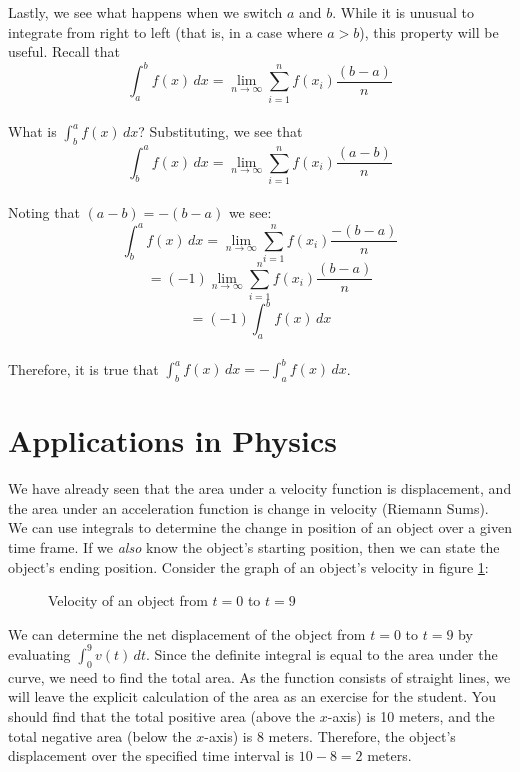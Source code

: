 Lastly, we see what happens when we switch $a$ and $b$. While it is 
unusual to integrate from right to left (that is, in a case where 
$a > b$), this property will be useful. Recall that $$\int_a^b f(x)\,dx 
= \lim_{n \to \infty} \sum_{i = 1}^{n} f(x_i)\frac{(b - a)}{n}$$\\ 
What is $\int_b^a f(x)\,dx$? Substituting, we see that $$\int_b^a f(x)
\,dx =\lim_{n \to \infty} \sum_{i=1}^{n} f(x_i) \frac{(a - b)}{n}$$\\ 
Noting that $(a - b) = -(b - a)$ we see: $$\int_b^a f(x)\,dx = \lim_{n \to 
\infty} \sum_{i = 1}^{n} f(x_i) \frac{-(b - a)}{n}$$ $$=(-1)\lim_{n 
\to \infty} \sum_{i = 1}^{n} f(x_i) \frac{(b - a)}{n}$$ $$=(-1)
\int_a^b f(x)\,dx$$ \\
Therefore, it is true that $\int_b^a f(x)\,dx = -\int_a^b f(x)\,dx$. 

\section{Applications in Physics}
We have already seen that the area under a velocity function is 
displacement, and the area under an acceleration function is change in 
velocity (Riemann Sums). We can use integrals to determine the change 
in position of an object over a given time frame. If we \textit{also} 
know the object's starting position, then we can state the object's 
ending position. Consider the graph of an object's velocity in figure 
\ref{fig:velocity-definite_integral}:

\begin{figure}[H]
	\caption{Velocity of an object from $t=0$ to $t=9$}
	\label{fig:velocity-definite_integral}
\end{figure}

We can determine the net displacement of the object from $t = 0$ to 
$t = 9$ by evaluating $\int_{0}^{9} v(t)\, dt$. Since the definite 
integral is equal to the area under the curve, we need to find the 
total area. As the function consists of straight lines, we will leave 
the explicit calculation of the area as an exercise for the student. 
You should find that the total positive area (above the $x$-axis) is 
10 meters, and the total negative area (below the $x$-axis) is 8 meters. 
Therefore, the object's displacement over the specified time interval 
is $10 - 8 = 2$ meters. 

